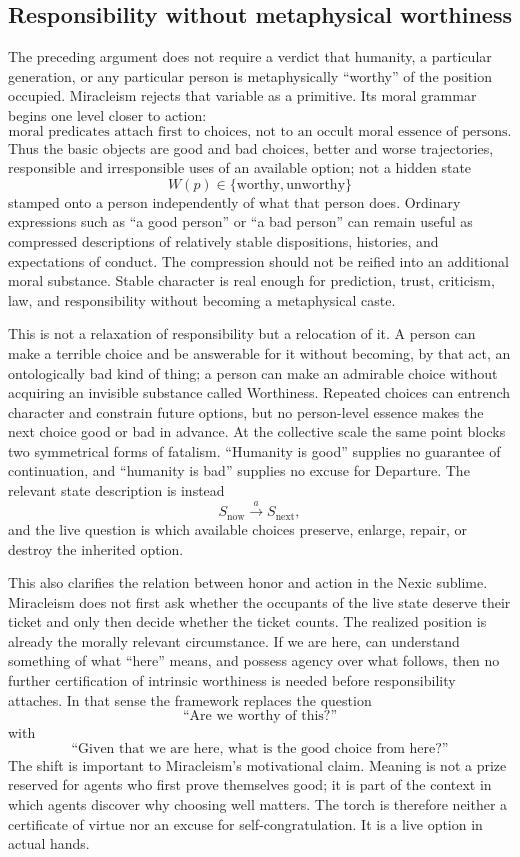 \subsection*{Responsibility without metaphysical worthiness}
The preceding argument does not require a verdict that humanity, a
particular generation, or any particular person is metaphysically
``worthy'' of the position occupied. Miracleism rejects that variable as
a primitive. Its moral grammar begins one level closer to action:
\[
\boxed{\text{moral predicates attach first to choices, not to an occult
moral essence of persons}.}
\]
Thus the basic objects are good and bad choices, better and worse
trajectories, responsible and irresponsible uses of an available option;
not a hidden state
\[
W(p)\in\{\text{worthy},\text{unworthy}\}
\]
stamped onto a person independently of what that person does. Ordinary
expressions such as ``a good person'' or ``a bad person'' can remain useful
as compressed descriptions of relatively stable dispositions, histories,
and expectations of conduct. The compression should not be reified into
an additional moral substance. Stable character is real enough for
prediction, trust, criticism, law, and responsibility without becoming a
metaphysical caste.

This is not a relaxation of responsibility but a relocation of it. A
person can make a terrible choice and be answerable for it without
becoming, by that act, an ontologically bad kind of thing; a person can
make an admirable choice without acquiring an invisible substance called
Worthiness. Repeated choices can entrench character and constrain future
options, but no person-level essence makes the next choice good or bad in
advance. At the collective scale the same point blocks two symmetrical
forms of fatalism. ``Humanity is good'' supplies no guarantee of
continuation, and ``humanity is bad'' supplies no excuse for Departure.
The relevant state description is instead
\[
S_{\mathrm{now}}\xrightarrow{\ a\ }S_{\mathrm{next}},
\]
and the live question is which available choices preserve, enlarge,
repair, or destroy the inherited option.

This also clarifies the relation between honor and action in the Nexic
sublime. Miracleism does not first ask whether the occupants of the live
state deserve their ticket and only then decide whether the ticket counts.
The realized position is already the morally relevant circumstance. If
we are here, can understand something of what ``here'' means, and possess
agency over what follows, then no further certification of intrinsic
worthiness is needed before responsibility attaches. In that sense the
framework replaces the question
\[
\text{``Are we worthy of this?''}
\]
with
\[
\boxed{\text{``Given that we are here, what is the good choice from
here?''}}
\]
The shift is important to Miracleism's motivational claim. Meaning is not
a prize reserved for agents who first prove themselves good; it is part
of the context in which agents discover why choosing well matters. The
torch is therefore neither a certificate of virtue nor an excuse for
self-congratulation. It is a live option in actual hands.

